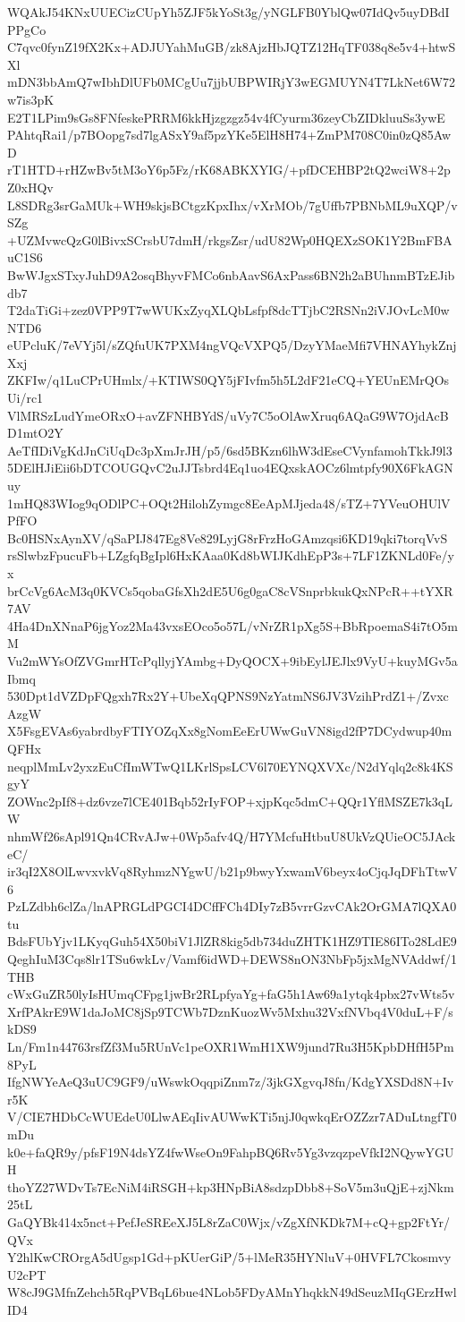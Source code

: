 WQAkJ54KNxUUECizCUpYh5ZJF5kYoSt3g/yNGLFB0YblQw07IdQv5uyDBdIPPgCo
C7qvc0fynZ19fX2Kx+ADJUYahMuGB/zk8AjzHbJQTZ12HqTF038q8e5v4+htwSXl
mDN3bbAmQ7wIbhDlUFb0MCgUu7jjbUBPWIRjY3wEGMUYN4T7LkNet6W72w7is3pK
E2T1LPim9sGs8FNfeskePRRM6kkHjzgzgz54v4fCyurm36zeyCbZIDkluuSs3ywE
PAhtqRai1/p7BOopg7sd7lgASxY9af5pzYKe5ElH8H74+ZmPM708C0in0zQ85AwD
rT1HTD+rHZwBv5tM3oY6p5Fz/rK68ABKXYIG/+pfDCEHBP2tQ2wciW8+2pZ0xHQv
L8SDRg3srGaMUk+WH9skjsBCtgzKpxIhx/vXrMOb/7gUffb7PBNbML9uXQP/vSZg
+UZMvwcQzG0lBivxSCrsbU7dmH/rkgsZsr/udU82Wp0HQEXzSOK1Y2BmFBAuC1S6
BwWJgxSTxyJuhD9A2osqBhyvFMCo6nbAavS6AxPass6BN2h2aBUhnmBTzEJibdb7
T2daTiGi+zez0VPP9T7wWUKxZyqXLQbLsfpf8dcTTjbC2RSNn2iVJOvLcM0wNTD6
eUPcluK/7eVYj5l/sZQfuUK7PXM4ngVQcVXPQ5/DzyYMaeMfi7VHNAYhykZnjXxj
ZKFIw/q1LuCPrUHmlx/+KTIWS0QY5jFIvfm5h5L2dF21eCQ+YEUnEMrQOsUi/rc1
VlMRSzLudYmeORxO+avZFNHBYdS/uVy7C5oOlAwXruq6AQaG9W7OjdAcBD1mtO2Y
AeTfIDiVgKdJnCiUqDc3pXmJrJH/p5/6sd5BKzn6lhW3dEseCVynfamohTkkJ9l3
5DElHJiEii6bDTCOUGQvC2uJJTsbrd4Eq1uo4EQxskAOCz6lmtpfy90X6FkAGNuy
1mHQ83WIog9qODlPC+OQt2HilohZymgc8EeApMJjeda48/sTZ+7YVeuOHUlVPfFO
Bc0HSNxAynXV/qSaPIJ847Eg8Ve829LyjG8rFrzHoGAmzqsi6KD19qki7torqVvS
rsSlwbzFpucuFb+LZgfqBgIpl6HxKAaa0Kd8bWIJKdhEpP3s+7LF1ZKNLd0Fe/yx
brCcVg6AcM3q0KVCs5qobaGfsXh2dE5U6g0gaC8cVSnprbkukQxNPcR++tYXR7AV
4Ha4DnXNnaP6jgYoz2Ma43vxsEOco5o57L/vNrZR1pXg5S+BbRpoemaS4i7tO5mM
Vu2mWYsOfZVGmrHTcPqllyjYAmbg+DyQOCX+9ibEylJEJlx9VyU+kuyMGv5aIbmq
530Dpt1dVZDpFQgxh7Rx2Y+UbeXqQPNS9NzYatmNS6JV3VzihPrdZ1+/ZvxcAzgW
X5FsgEVAs6yabrdbyFTIYOZqXx8gNomEeErUWwGuVN8igd2fP7DCydwup40mQFHx
neqplMmLv2yxzEuCfImWTwQ1LKrlSpsLCV6l70EYNQXVXc/N2dYqlq2c8k4KSgyY
ZOWnc2pIf8+dz6vze7lCE401Bqb52rIyFOP+xjpKqc5dmC+QQr1YflMSZE7k3qLW
nhmWf26sApl91Qn4CRvAJw+0Wp5afv4Q/H7YMcfuHtbuU8UkVzQUieOC5JAckeC/
ir3qI2X8OlLwvxvkVq8RyhmzNYgwU/b21p9bwyYxwamV6beyx4oCjqJqDFhTtwV6
PzLZdbh6clZa/lnAPRGLdPGCI4DCffFCh4DIy7zB5vrrGzvCAk2OrGMA7lQXA0tu
BdsFUbYjv1LKyqGuh54X50biV1JlZR8kig5db734duZHTK1HZ9TIE86ITo28LdE9
QeghIuM3Cqs8lr1TSu6wkLv/Vamf6idWD+DEWS8nON3NbFp5jxMgNVAddwf/1THB
cWxGuZR50lyIsHUmqCFpg1jwBr2RLpfyaYg+faG5h1Aw69a1ytqk4pbx27vWts5v
XrfPAkrE9W1daJoMC8jSp9TCWb7DznKuozWv5Mxhu32VxfNVbq4V0duL+F/skDS9
Ln/Fm1n44763rsfZf3Mu5RUnVc1peOXR1WmH1XW9jund7Ru3H5KpbDHfH5Pm8PyL
IfgNWYeAeQ3uUC9GF9/uWswkOqqpiZnm7z/3jkGXgvqJ8fn/KdgYXSDd8N+Ivr5K
V/CIE7HDbCcWUEdeU0LlwAEqIivAUWwKTi5njJ0qwkqErOZZzr7ADuLtngfT0mDu
k0e+faQR9y/pfsF19N4dsYZ4fwWseOn9FahpBQ6Rv5Yg3vzqzpeVfkI2NQywYGUH
thoYZ27WDvTs7EcNiM4iRSGH+kp3HNpBiA8sdzpDbb8+SoV5m3uQjE+zjNkm25tL
GaQYBk414x5nct+PefJeSREeXJ5L8rZaC0Wjx/vZgXfNKDk7M+cQ+gp2FtYr/QVx
Y2hlKwCROrgA5dUgsp1Gd+pKUerGiP/5+lMeR35HYNluV+0HVFL7CkosmvyU2cPT
W8cJ9GMfnZehch5RqPVBqL6bue4NLob5FDyAMnYhqkkN49dSeuzMIqGErzHwlID4
